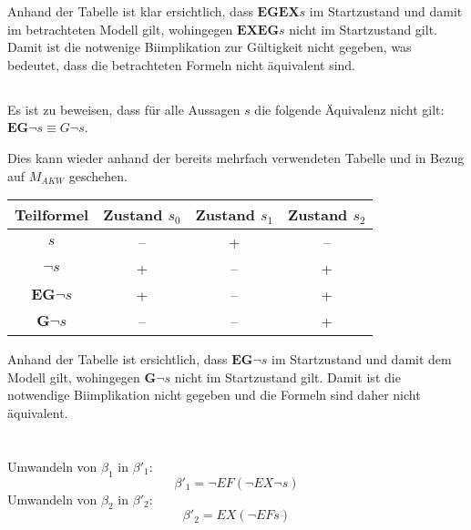 \documentclass[10pt,a4paper,oneside,ngerman,numbers=noenddot]{scrartcl}
\begin{document}
	Anhand der Tabelle ist klar ersichtlich, dass \(\textbf{EGEX}s\) im Startzustand und damit im betrachteten Modell gilt, wohingegen \(\textbf{EXEG}s\) nicht im Startzustand gilt. Damit ist die notwenige Biimplikation zur Gültigkeit nicht gegeben, was bedeutet, dass die betrachteten Formeln nicht äquivalent sind.
	
	\subsection{}
		\subsubsection{}
		\subsubsection{}
		Es ist zu beweisen, dass für alle Aussagen \(s\) die folgende Äquivalenz nicht gilt: \(\textbf{EG}\lnot s \equiv G \lnot s\).
		
		Dies kann wieder anhand der bereits mehrfach verwendeten Tabelle und in Bezug auf \(M_{AKW}\) geschehen.
		
	\begin{tabular}{c|c|c|c}
		Teilformel & Zustand \(s_{0}\) & Zustand \(s_{1}\) & Zustand \(s_{2}\) \\
		\hline
		\hline
		\(s\) & -- & + & -- \\
		\(\lnot s\) & + & -- & + \\
		\(\textbf{EG}\lnot s\) & + & -- & + \\
		\(\textbf{G}\lnot s\) & -- & -- & +
	\end{tabular}
	
	Anhand der Tabelle ist ersichtlich, dass \(\textbf{EG}\lnot s\) im Startzustand und damit dem Modell gilt, wohingegen \(\textbf{G}\lnot s\) nicht im Startzustand gilt. Damit ist die notwendige Biimplikation nicht gegeben und die Formeln sind daher nicht äquivalent.
\section{} %
	\subsection{}
	Umwandeln von \(\beta _{1}\) in \(\beta '_{1}\):
	\[\beta '_{1} = \lnot EF(\lnot EX \lnot s)\]
	Umwandeln von \(\beta _{2}\) in \(\beta '_{2}\):
	\[\beta '_{2} = EX(\lnot EF s)\]
	
\end{document}
